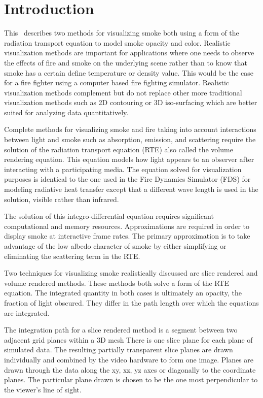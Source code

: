 %
%

\section{Introduction}

This \paper\ describes two methods for visualizing smoke  both using a form of the radiation transport equation\cite{Siegel:2001,kajiya:1986} to  model
smoke opacity and color. Realistic visualization methods are important for applications
where one needs to observe the effects of fire and smoke on the underlying scene
rather than to know that smoke has a certain define temperature or density value.  This would be the case for a fire fighter using a computer based fire fighting simulator.
Realistic visualization  methods complement but do not replace other more traditional visualization methods such as 2D
contouring or 3D iso-surfacing which are better suited for analyzing data quantitatively.

Complete methods for visualizing smoke and fire taking into
account interactions between light and smoke such as absorption, emission, and scattering
require the solution of the radiation transport equation (RTE)\cite{Siegel:2001} also called the volume rendering equation\cite{levoy:1988}.
This equation models how light appears to an observer after interacting with a participating media.
The equation solved  for visualization purposes is identical to the one used in the Fire Dynamics Simulator (FDS)\cite{FDS_Tech_Guide}
for modeling radiative heat transfer except that a different wave length is used in the solution, visible rather than infrared.

The
solution of this integro-differential equation requires significant
computational and memory  resources.  Approximations
are required in order to display smoke at
interactive frame rates.  The primary approximation is to take
advantage of the low albedo character of smoke by either simplifying or eliminating the scattering term in the RTE.

Two techniques for visualizing smoke realistically discussed are slice rendered and volume
rendered methods.  These methods both solve a form of the RTE equation.
The integrated quantity in both cases is ultimately an opacity, the fraction of light obscured.
They
differ in the path length over which the equations are integrated.

The integration path for a slice rendered method is a segment between two adjacent grid planes within a 3D mesh
There is one slice plane for each plane of simulated data.
The resulting partially transparent slice planes are drawn individually and
combined by the video hardware to form one image. Planes are drawn through the data along the xy, xz, yz axes or diagonally to the coordinate planes.  The particular plane drawn is chosen to be the one most perpendicular to the viewer's line of sight.


